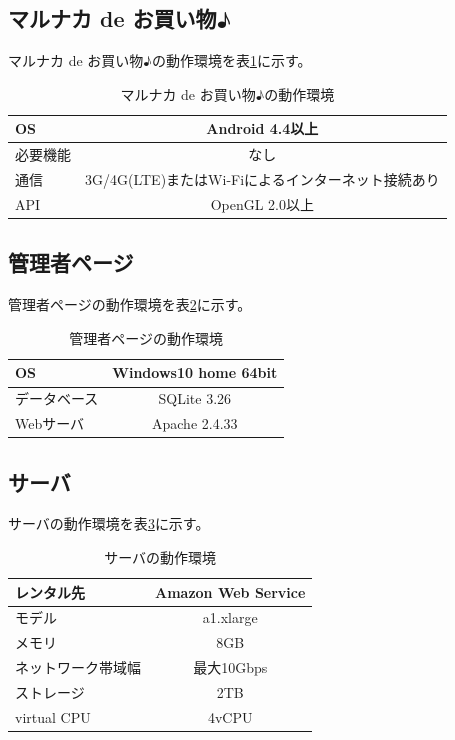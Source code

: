 \documentclass[a4j]{jarticle}
\begin{document}
\subsection{マルナカ de お買い物♪}
マルナカ de お買い物♪の動作環境を表\ref{Dmarunaka}に示す。
\begin{table}[h]
  \begin{center}
    \caption{マルナカ de お買い物♪の動作環境}
    \begin{tabular}{|l|c|}\hline
      OS&Android 4.4以上\\ \hline
      必要機能&なし\\ \hline
      通信& 3G/4G(LTE)またはWi-Fiによるインターネット接続あり\\ \hline
      API&OpenGL 2.0以上 \\ \hline
    \end{tabular}
    \label{Dmarunaka}
  \end{center}
\end{table}

\newpage

\subsection{管理者ページ}
管理者ページの動作環境を表\ref{Dmaster}に示す。
\begin{table}[h]
  \begin{center}
    \caption{管理者ページの動作環境}
    \begin{tabular}{|l|c|}\hline
      OS&Windows10 home 64bit\\ \hline
      データベース&SQLite 3.26\\ \hline
      Webサーバ&Apache 2.4.33\\ \hline
    \end{tabular}
    \label{Dmaster}
  \end{center}
\end{table}

\subsection{サーバ}
サーバの動作環境を表\ref{Dsaba}に示す。
\begin{table}[h]
  \begin{center}
    \caption{サーバの動作環境}
    \begin{tabular}{|l|c|}\hline
      レンタル先&Amazon Web Service\\ \hline
      モデル&a1.xlarge\\ \hline
      メモリ&8GB\\ \hline
      ネットワーク帯域幅&最大10Gbps\\ \hline
      ストレージ&2TB\\ \hline
      virtual CPU&4vCPU\\ \hline
    \end{tabular}
    \label{Dsaba}
  \end{center}
\end{table}
\end{document}
